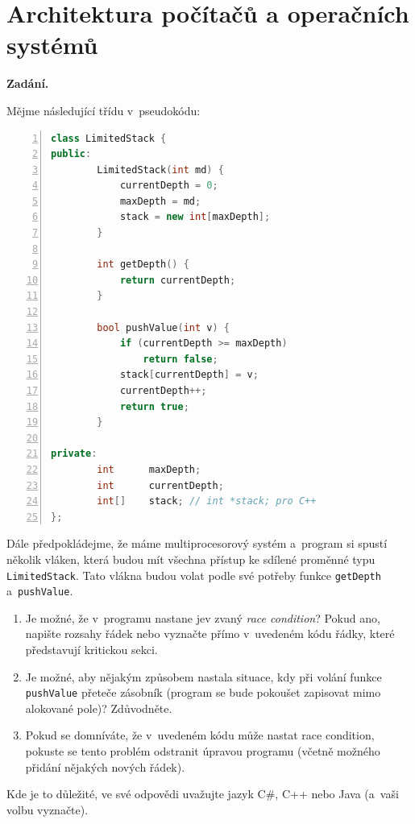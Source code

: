 \section{Architektura počítačů a operačních systémů}

\noindent\textbf{Zadání.}\par
Mějme následující třídu v~pseudokódu:

\begin{lstlisting}[language=C++,numbers=left]
class LimitedStack {
public:
        LimitedStack(int md) {
            currentDepth = 0;
            maxDepth = md;
            stack = new int[maxDepth];
        }

        int getDepth() {
            return currentDepth;
        }

        bool pushValue(int v) {
            if (currentDepth >= maxDepth)
                return false;
            stack[currentDepth] = v;
            currentDepth++;
            return true;
        }

private:
        int      maxDepth;
        int      currentDepth;
        int[]    stack; // int *stack; pro C++
};
\end{lstlisting}

Dále předpokládejme, že máme multiprocesorový systém a~program si spustí několik vláken,
která budou mít všechna přístup ke sdílené proměnné typu \texttt{LimitedStack}. Tato vlákna
budou volat podle své potřeby funkce \texttt{getDepth} a~\texttt{pushValue}.

\begin{enumerate}
\item Je možné, že v~programu nastane jev zvaný \textit{race condition}? Pokud ano,
  napište rozsahy řádek nebo vyznačte přímo v~uvedeném kódu řádky, které představují
  kritickou sekci.
\item Je možné, aby nějakým způsobem nastala situace, kdy při volání funkce
  \texttt{pushValue} přeteče zásobník (program se bude pokoušet zapisovat mimo alokované
  pole)? Zdůvodněte.
\item Pokud se domníváte, že v~uvedeném kódu může nastat race condition, pokuste se tento
  problém odstranit úpravou programu (včetně možného přidání nějakých nových řádek).
\end{enumerate}
Kde je to důležité, ve své odpovědi uvažujte jazyk C\#, C++ nebo Java (a~vaši volbu vyznačte).

